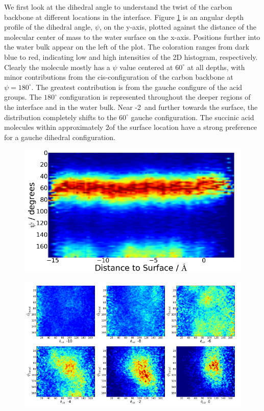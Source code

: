 We first look at the dihedral angle to understand the twist of the carbon backbone at different locations in the interface. Figure \ref{fig:dihedral} is an angular depth profile of the dihedral angle, $\psi$, on the y-axis, plotted against the distance of the molecular center of mass to the water surface on the x-axis. Positions further into the water bulk appear on the left of the plot. The coloration ranges from dark blue to red, indicating low and high intensities of the 2D histogram, respectively. Clearly the molecule mostly has a $\psi$ value centered at $60^{\circ}$ at all depths, with minor contributions from the cis-configuration of the carbon backbone at $\psi = 180^{\circ}$. The greatest contribution is from the gauche configure of the acid groups. The $180^{\circ}$ configuration is represented throughout the deeper regions of the interface and in the water bulk. Near -2\angs~and further towards the surface, the distribution completely shifts to the $60^{\circ}$ gauche configuration. The succinic acid molecules within approximately 2\angs of the surface location have a strong preference for a gauche dihedral configuration. 

\begin{figure}[h!]
	\begin{center}
		\includegraphics[scale=1.0]{images/dihedral/dihedral-small.png}
		\caption{}
		\label{fig:dihedral}
	\end{center}
\end{figure}

\begin{figure}[h!]
	\begin{center}
		\includegraphics[scale=1.0]{images/bond-angles/carbonyl-tilt-twist-small.png}
		\caption{}
		\label{fig:tilt-twist}
	\end{center}
\end{figure}
